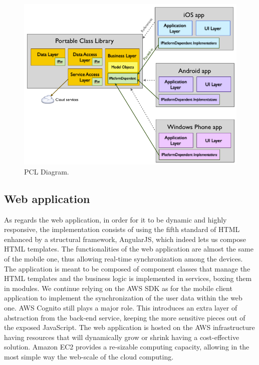 \begin{figure}[H]
  \centering
  \includegraphics[width=6in]{diagrams/PCLDiagram.png} 
  \caption{PCL Diagram\cite{pcl}.}
  \label{fig:pcld}
\end{figure}

\subsection*{Web application}
As regards the web application, in order for it to be dynamic and highly responsive, the implementation consists of using the fifth standard of HTML enhanced by a structural framework, AngularJS, which indeed lets us compose HTML templates. The functionalities of the web application are almost the same of the mobile one, thus allowing real-time synchronization among the devices. The application is meant to be composed of component classes that manage the HTML templates and the business logic is implemented in services, boxing them in modules. We continue relying on the AWS SDK as for the mobile client application to implement the synchronization of the user data within the web one. 
AWS Cognito still plays a major role. This introduces an extra layer of abstraction from the back-end service, keeping the more sensitive pieces out of the exposed JavaScript.
The web application is hosted on the AWS infrastructure having resources that will dynamically grow or shrink having a cost-effective solution. Amazon EC2 provides a re-sizable computing capacity, allowing in the most simple way the web-scale of the cloud computing.

